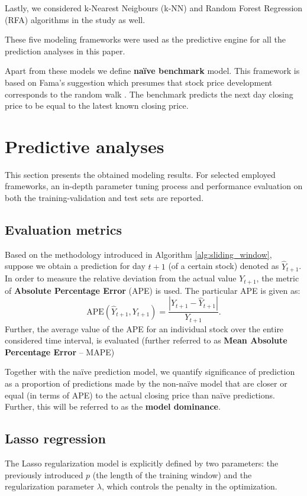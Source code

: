 \documentclass{svk_en}
\begin{document}
Lastly, we considered k-Nearest Neigbours (k-NN) and Random Forest Regression (RFA) algorithms in the study as well.

These five modeling frameworks were used as the predictive engine
for all the prediction analyses in this paper.

Apart from these models we define \textbf{naïve benchmark} model. This framework is based on Fama's suggestion which presumes that stock price development corresponds to the random walk \cite{fama1970efficient}.
The benchmark predicts the next day closing price to be equal to the latest known closing price.

\section{Predictive analyses}

This section presents the obtained modeling results. For selected employed frameworks, an in-depth parameter tuning process and performance evaluation on both
the training-validation and test sets are reported.

\subsection{Evaluation metrics}

Based on the methodology introduced in Algorithm \ref{alg:sliding_window}, suppose we obtain a prediction for day $t+1$ (of a certain stock) denoted as $\hat{Y}_{t+1}$.
In order to measure the relative deviation from the actual value $Y_{t+1}$, the metric of \textbf{Absolute Percentage Error} (APE) is used. The particular APE is given as:
\begin{equation*}
    \text{APE}(\hat{Y}_{t+1}, Y_{t+1})=\frac{|Y_{t+1}-\hat{Y}_{t+1}|}{Y_{t+1}}.
\end{equation*}
Further, the average value of the APE for an individual stock over the entire considered time interval, is evaluated (further referred to as \textbf{Mean Absolute Percentage Error} -- MAPE)

Together with the naïve prediction model, we quantify significance of prediction as a proportion
of predictions made by the non-naïve model that are closer or equal (in terms of APE) to the actual closing price than naïve predictions. Further, this will be referred to as the \textbf{model dominance}.

\subsection{Lasso regression}
The Lasso regularization model is explicitly defined by two parameters: the previously introduced $p$ (the length of the training window) and the regularization parameter $\lambda$, which controls the penalty in the optimization.
\end{document}
